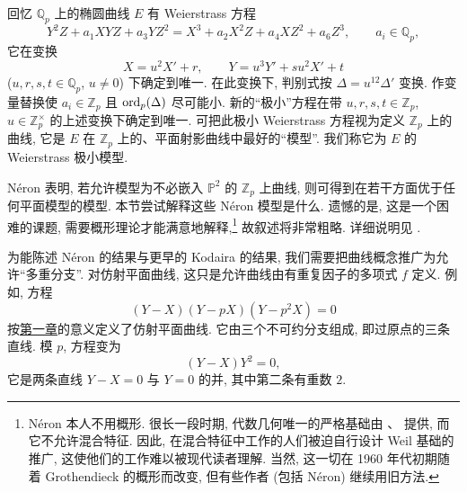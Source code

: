 回忆 $\mathbb{Q}_p$ 上的椭圆曲线 $E$ 有 Weierstrass 方程
\[
Y^2Z + a_1XYZ + a_3YZ^2 = X^3 + a_2X^2Z + a_4XZ^2 + a_6Z^3, \qquad a_i\in\mathbb{Q}_p,
\]
它在变换
\[
X = u^2X' + r, \qquad Y = u^3Y' + su^2X' + t
\]
($u, r, s, t\in\mathbb{Q}_p$, $u\neq 0$) 下确定到唯一. 在此变换下, 判别式按 $\Delta = u^{12}\Delta'$ 变换. 作变量替换使 $a_i\in\mathbb{Z}_p$ 且 $\operatorname*{ord}\nolimits_p(\Delta)$ 尽可能小. 新的``极小''方程在带 $u, r, s, t\in\mathbb{Z}_p$, $u\in\mathbb{Z}_p^{\times}$ 的上述变换下确定到唯一. 可把此极小 Weierstrass 方程视为定义 $\mathbb{Z}_p$ 上的曲线, 它是 $E$ 在 $\mathbb{Z}_p$ 上的、平面射影曲线中最好的``模型''. 我们称它为 $E$ 的 Weierstrass 极小模型.

N\'eron 表明, 若允许模型为不必嵌入 $\mathbb{P}^2$ 的 $\mathbb{Z}_p$ 上曲线, 则可得到在若干方面优于任何平面模型的模型. 本节尝试解释这些 N\'eron 模型是什么. 遗憾的是, 这是一个困难的课题, 需要概形理论才能满意地解释,\footnote{N\'eron 本人不用概形. 很长一段时期, 代数几何唯一的严格基础由 \cite{weil1946}、\cite{weil1962} 提供, 而它不允许混合特征. 因此, 在混合特征中工作的人们被迫自行设计 Weil 基础的推广, 这使他们的工作难以被现代读者理解. 当然, 这一切在 1960 年代初期随着 Grothendieck 的概形而改变, 但有些作者 (包括 N\'eron) 继续用旧方法.} 故叙述将非常粗略. 详细说明见 \cite[Chap.~IV]{silverman1994}.

为能陈述 N\'eron 的结果与更早的 Kodaira 的结果, 我们需要把曲线概念推广为允许``多重分支''. 对仿射平面曲线, 这只是允许曲线由有重复因子的多项式 $f$ 定义. 例如, 方程
\[
(Y-X)(Y-pX)(Y-p^2X) = 0
\]
按\hyperref[ch:1]{第一章}的意义定义了仿射平面曲线. 它由三个不可约分支组成, 即过原点的三条直线. 模 $p$, 方程变为
\[
(Y-X)Y^2 = 0,
\]
它是两条直线 $Y - X = 0$ 与 $Y = 0$ 的并, 其中第二条有重数 $2$.

\begin{center}
\end{center}


